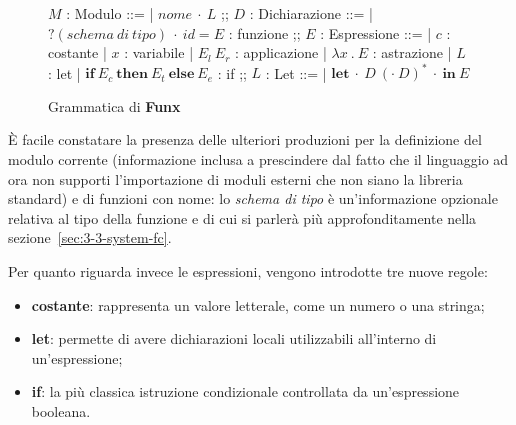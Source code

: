 \newpage

\begin{figure}
    \begin{bnf}
        $M$ : \small{Modulo} ::=
        | $nome\ \cdot\ L$
        ;;
        $D$ : \small{Dichiarazione} ::=
        | $?(schema\ di\ tipo)\ \cdot\ id = E$ : \small{funzione}
        ;;
        $E$ : \small{Espressione} ::=
        | $c$ : \small{costante}
        | $x$ : \small{variabile}
        | $E_l\ E_r$ : \small{applicazione}
        | $\lambda x\ .\ E$ : \small{astrazione}
        | $L$ : \small{let}
        | $\textbf{if}\ E_c\ \textbf{then}\ E_t\ \textbf{else}\ E_e$ : \small{if}
        ;;
        $L$ : \small{Let} ::=
        | $\textbf{let}\ \cdot\ D\ (\cdot\ D)^*\ \cdot\ \textbf{in}\ E$
    \end{bnf}
    \caption{Grammatica di \textbf{Funx}}
    \label{fig:2-3-funx-syntax}
    \vspace{4mm}
\end{figure}

\noindent È facile constatare la presenza delle ulteriori produzioni per la definizione del modulo corrente
(informazione inclusa a prescindere dal fatto che il linguaggio ad ora non supporti l'importazione di moduli esterni
che non siano la libreria standard) e di funzioni con nome: lo \textit{schema di tipo} è un'informazione opzionale
relativa al tipo della funzione e di cui si parlerà più approfonditamente nella sezione~\ref{sec:3-3-system-fc}.

\noindent Per quanto riguarda invece le espressioni, vengono introdotte tre nuove regole:
\begin{itemize}
    \item \textbf{costante}: rappresenta un valore letterale, come un numero o una stringa;
    \item \textbf{let}: permette di avere dichiarazioni locali utilizzabili all'interno di un'espressione;
    \item \textbf{if}: la più classica istruzione condizionale controllata da un'espressione booleana.
\end{itemize}

